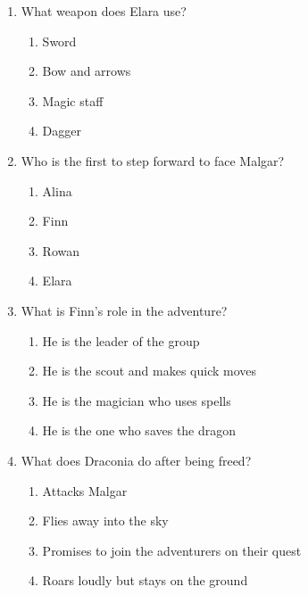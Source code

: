 \documentclass[12pt]{article}
\begin{document}
\begin{enumerate}
\vspace{0.5cm}

\item What weapon does Elara use?
\begin{enumerate}[label=\Alph*.]
    \item Sword
    \item Bow and arrows
    \item Magic staff
    \item Dagger
\end{enumerate}

\vspace{0.5cm}

\item Who is the first to step forward to face Malgar?
\begin{enumerate}[label=\Alph*.]
    \item Alina
    \item Finn
    \item Rowan
    \item Elara
\end{enumerate}

\vspace{0.5cm}

\item What is Finn’s role in the adventure?
\begin{enumerate}[label=\Alph*.]
    \item He is the leader of the group
    \item He is the scout and makes quick moves
    \item He is the magician who uses spells
    \item He is the one who saves the dragon
\end{enumerate}

\vspace{0.5cm}

\item What does Draconia do after being freed?
\begin{enumerate}[label=\Alph*.]
    \item Attacks Malgar
    \item Flies away into the sky
    \item Promises to join the adventurers on their quest
    \item Roars loudly but stays on the ground
\end{enumerate}

\vspace{0.5cm}


\end{enumerate}
\end{document}
